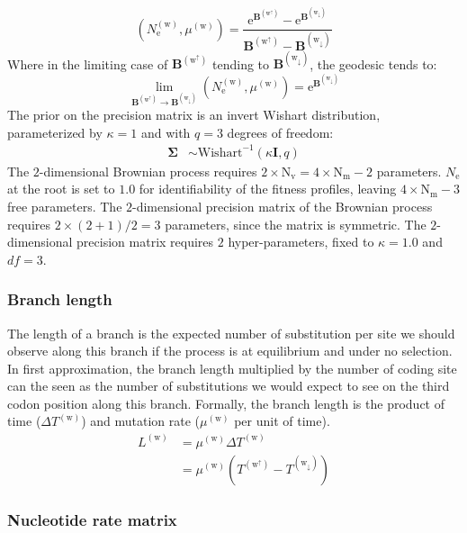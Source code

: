 \documentclass{article}
\newcommand{\e}{\mathrm{e}}
\newcommand{\Ne}{N_\e}
\newcommand{\taxon}{\text{m}}
\newcommand{\Ntaxa}{\text{N}_{\taxon}}
\newcommand{\branch}{\text{w}}
\newcommand{\branchexp}{^{(\branch)}}
\newcommand{\up}{\branch^{\uparrow}}
\newcommand{\down}{\branch_{\downarrow}}
\newcommand{\node}{\text{v}}
\newcommand{\Nnode}{\text{N}_{\node}}
\newcommand{\age}{T}
\newcommand{\branchtime}{\Delta \age}
\newcommand{\branchlength}{L}
\newcommand{\brownian}{\bm{B}}
\newcommand{\covariance}{\bm{\Sigma}}
\newcommand{\covariancedf}{q}
\newcommand{\covariancekappa}{\kappa}
\begin{document}
\begin{equation}
\left(\Ne\branchexp, \mu\branchexp\right) = \dfrac{\e^{\brownian^{(\up)}} - \e^{\brownian^{(\down)}}}{\brownian^{(\up)} - \brownian^{(\down)}}
\end{equation}
Where in the limiting case of $\brownian^{(\up)}$ tending to $\brownian^{(\down)}$, the geodesic tends to:
\begin{equation}
\lim_{\brownian^{(\up)} \to \brownian^{(\down)}} \left(\Ne\branchexp, \mu\branchexp\right) =  \e^{\brownian^{(\down)}}
\end{equation}
The prior on the precision matrix is an invert Wishart distribution, parameterized by $\covariancekappa=1$ and with $\covariancedf=3$ degrees of freedom:
\begin{align}
\label{eq:Distribcovariance}
\covariance & \sim \mathrm{Wishart}^{-1} (\covariancekappa \bm{I}, \covariancedf)
\end{align}
The $2$-dimensional Brownian process requires $ 2 \times \Nnode =  4 \times \Ntaxa - 2 $ parameters.
$\Ne$ at the root is set to $1.0$ for identifiability of the fitness profiles, leaving $4 \times \Ntaxa - 3 $ free parameters.
The $2$-dimensional precision matrix of the Brownian process requires $2 \times (2 + 1) / 2 = 3$ parameters, since the matrix is symmetric.
The $2$-dimensional precision matrix requires $2$ hyper-parameters, fixed to $\covariancekappa=1.0$ and $df=3$.

\subsubsection{Branch length}

The length of a branch is the expected number of substitution per site we should observe along this branch if the process is at equilibrium and under no selection. In first approximation, the branch length multiplied by the number of coding site can the seen as the number of substitutions we would expect to see on the third codon position along this branch.
Formally, the branch length is the product of time ($\branchtime\branchexp$) and mutation rate ($\mu\branchexp$ per unit of time). 
\begin{align}
\branchlength \branchexp & = \mu\branchexp \branchtime\branchexp \nonumber \\
			  & = \mu\branchexp \left( T^{(\up)} - T^{(\down)} \right)
\end{align}


\subsubsection{Nucleotide rate matrix}
\end{document}
